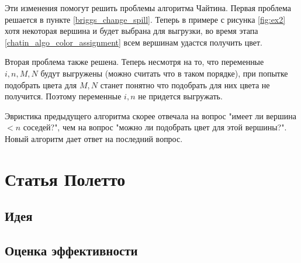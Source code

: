 \documentclass[12pt]{article}
\begin{document}
Эти изменения помогут решить проблемы алгоритма Чайтина. Первая проблема решается в пункте \ref{briggs_change_spill}.
Теперь в примере с рисунка \ref{fig:ex2} хотя некоторая вершина и будет выбрана для выгрузки, во время этапа \ref{chatin_algo_color_assignment}
всем вершинам удастся получить цвет.

Вторая проблема также решена. Теперь несмотря на то, что переменные $i, n, M, N$ будут выгружены (можно считать что в таком
порядке), при попытке подобрать цвета для $M, N$ станет понятно что подобрать для них цвета не получится.
Поэтому переменные $i, n$ не придется выгружать.

Эвристика предыдущего алгоритма скорее отвечала на
вопрос "имеет ли вершина $< n$ соседей?", чем на вопрос "можно ли подобрать цвет для этой вершины?". Новый
алгоритм дает ответ на последний вопрос.

\section{Статья Полетто}
\subsection{Идея}
\subsection{Оценка эффективности}
\end{document}
